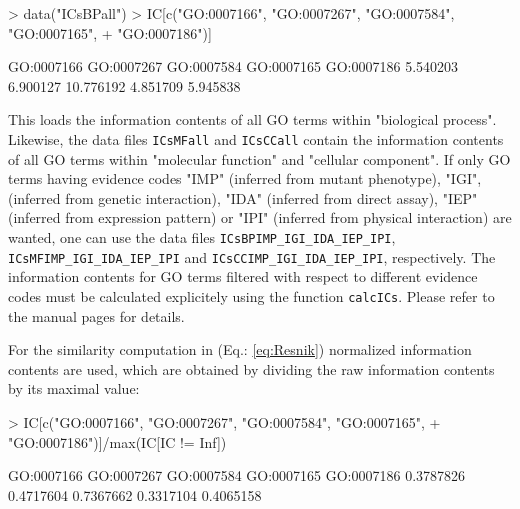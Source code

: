 \documentclass[12pt,a4paper]{article}
\begin{document}
\begin{Schunk}
\begin{Sinput}
> data("ICsBPall")
> IC[c("GO:0007166", "GO:0007267", "GO:0007584", "GO:0007165", 
+     "GO:0007186")]
\end{Sinput}
\begin{Soutput}
GO:0007166 GO:0007267 GO:0007584 GO:0007165 GO:0007186 
  5.540203   6.900127  10.776192   4.851709   5.945838 
\end{Soutput}
\end{Schunk}
This loads the information contents of all GO terms within "biological process". Likewise, the data files {\tt ICsMFall} and {\tt ICsCCall} contain the information contents of all GO terms within "molecular function" and "cellular component". If only GO terms having evidence codes "IMP" (inferred from mutant phenotype), "IGI", (inferred from genetic interaction), "IDA" (inferred from direct assay), "IEP" (inferred from expression pattern) or "IPI" (inferred from physical interaction) are wanted, one can use the data files {\tt ICsBPIMP\_IGI\_IDA\_IEP\_IPI}, {\tt ICsMFIMP\_IGI\_IDA\_IEP\_IPI} and {\tt ICsCCIMP\_IGI\_IDA\_IEP\_IPI}, respectively. The information contents for GO terms filtered with respect to different evidence codes must be calculated explicitely using the function {\tt calcICs}. Please refer to the manual pages for details.

For the similarity computation in (Eq.: \ref{eq:Resnik}) normalized information contents are used, which are obtained by dividing the raw information contents by its maximal value:
\begin{Schunk}
\begin{Sinput}
> IC[c("GO:0007166", "GO:0007267", "GO:0007584", "GO:0007165", 
+     "GO:0007186")]/max(IC[IC != Inf])
\end{Sinput}
\begin{Soutput}
GO:0007166 GO:0007267 GO:0007584 GO:0007165 GO:0007186 
 0.3787826  0.4717604  0.7367662  0.3317104  0.4065158 
\end{Soutput}
\end{Schunk}
\end{document}
